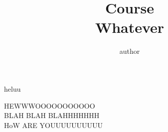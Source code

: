 \documentclass[addpoints]{exam}
\title{Course\\ Whatever}
\author{author}
\begin{document}
\maketitle

\begin{questions}
    \question
     heluu
    \begin{solution}
        HEWWWOOOOOOOOOOO \\ 
        BLAH BLAH BLAHHHHHHH \\ 
        HoW ARE YOUUUUUUUUUU \\
    \end{solution}
    
\end{questions}
\end{document}
